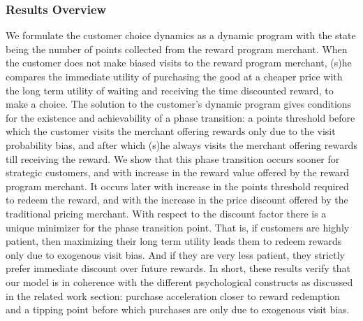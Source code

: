 \subsubsection{Results Overview}
We formulate the customer choice dynamics as a dynamic program with the state being the number of points collected from the reward program merchant.
When the customer does not make biased visits to the reward program merchant, (s)he compares the immediate utility of purchasing the good at a cheaper price with the long term utility of waiting and receiving the time discounted reward, to make a choice. 
The solution to the customer's dynamic program gives conditions for the existence and achievability of a phase transition: a points threshold before which the customer visits the merchant offering rewards only due to the visit probability bias, and after which (s)he always visits the merchant offering rewards till receiving the reward.
We show that this phase transition occurs sooner for strategic customers, and with increase in the reward value offered by the reward program merchant.
It occurs later with increase in the points threshold required to redeem the reward, and with the increase in the price discount offered by the traditional pricing merchant.
With respect to the discount factor there is a unique minimizer for the phase transition point. That is, if customers are highly patient, then maximizing their long term utility leads them to redeem rewards only due to exogenous visit bias.
And if they are very less patient, they strictly prefer immediate discount over future rewards.
In short, these results verify that our model is in coherence with the different psychological constructs as discussed in the related work section: purchase acceleration closer to reward redemption and a tipping point before which purchases are only due to exogenous visit bias.

